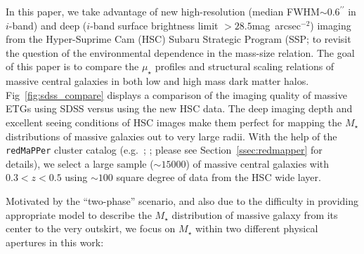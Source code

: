 \documentclass[a4paper,fleqn,usenatbib]{mnras}
\def\arcsec{{\prime\prime}}
\def\sb{mag~arcsec$^{-2}$}
\def\redm{\texttt{redMaPPer}}
\def\mstar{{$M_{\star}$}}
\def\mden{{$\mu_{\star}$}}
\begin{document}
    In this paper, we take advantage of new high-resolution (median 
    FWHM$\sim 0.6^{\arcsec}$ in $i$-band) and deep ($i$-band surface brightness 
    limit $> 28.5$\sb) imaging from the Hyper-Suprime Cam (HSC) Subaru Strategic 
    Program (SSP; \citealt{HSCDR1; will be referred as the HSC survey} to revisit the 
    question of the environmental dependence in the mass-size relation. 
    The goal of this paper is to compare the \mden{} profiles and structural scaling 
    relations of massive central galaxies in both low and high mass dark matter halos. 
    Fig~\ref{fig:sdss_compare} displays a comparison of the imaging quality of massive 
    ETGs using SDSS versus using the new HSC data. 
    The deep imaging depth and excellent seeing conditions of HSC images make them 
    perfect for mapping the \mstar{} distributions of massive galaxies out to very 
    large radii. 
    With the help of the \redm{} cluster catalog (e.g.\ \citealt{Rykoff2014}; 
    \citealt{Rozo2015b}; please see Section~\ref{ssec:redmapper} for details), we 
    select a large sample ($\sim 15000$) of massive central 
    galaxies with $0.3 < z < 0.5$ using $\sim 100$ square degree of data from the 
    HSC wide layer.
    
    Motivated by the ``two-phase'' scenario, and also due to the difficulty in 
    providing appropriate model to describe the \mstar{} distribution of massive 
    galaxy from its center to the very outskirt, we focus on \mstar{} within two 
    different physical apertures in this work:
    
\end{document}
